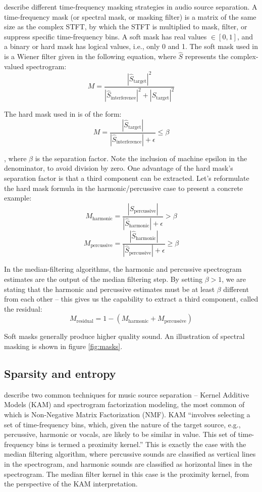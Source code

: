 \documentclass[letter,12pt]{article}
\begin{document}
\citet{masking} describe different time-frequency masking strategies in audio source separation. A time-frequency mask (or spectral mask, or masking filter) is a matrix of the same size as the complex STFT, by which the STFT is multiplied to mask, filter, or suppress specific time-frequency bins. A soft mask has real values $\in [0, 1]$, and a binary or hard mask has logical values, i.e., only 0 and 1. The soft mask used in \cite{fitzgerald1, fitzgerald2} is a Wiener filter given in the following equation, where $\hat{S}$ represents the complex-valued spectrogram:
\[ M = \frac{|\hat{S}_{\text{target}}|^{2}}{|\hat{S}_{\text{interference}}|^{2} + |\hat{S}_{\text{target}}|^{2}} \]

The hard mask used in \cite{driedger} is of the form:
\[ M = \frac{|\hat{S}_{\text{target}}|}{|\hat{S}_{\text{interference}}| + \epsilon} \le \beta \]

, where $\beta$ is the separation factor. Note the inclusion of machine epsilon in the denominator, to avoid division by zero. One advantage of the hard mask's separation factor is that a third component can be extracted. Let's reformulate the hard mask formula in the harmonic/percussive case to present a concrete example:
\[ M_{\text{harmonic}} = \frac{|\hat{S}_{\text{percussive}}|}{|\hat{S}_{\text{harmonic}}| + \epsilon} > \beta \]
\[ M_{\text{percussive}} = \frac{|\hat{S}_{\text{harmonic}}|}{|\hat{S}_{\text{percussive}}| + \epsilon} \ge \beta \]

In the median-filtering algorithms, the harmonic and percussive spectrogram estimates are the output of the median filtering step. By setting $\beta > 1$, we are stating that the harmonic and percussive estimates must be at least $\beta$ different from each other -- this gives us the capability to extract a third component, called the residual:
\[ M_{\text{residual}} = 1 - (M_{\text{harmonic}} + M_{\text{percussive}}) \]

Soft masks generally produce higher quality sound. An illustration of spectral masking is shown in figure \ref{fig:masks}.

\subsection{Sparsity and entropy}
\label{sec:theorysparsity}

\citet{musicsepgood} describe two common techniques for music source separation -- Kernel Additive Models (KAM) and spectrogram factorization modeling, the most common of which is Non-Negative Matrix Factorization (NMF). KAM ``involves selecting a set of time-frequency bins, which, given the nature of the target source, e.g., percussive, harmonic or vocals, are likely to be similar in value. This set of time-frequency bins is termed a proximity kernel.'' This is exactly the case with the median filtering algorithm, where percussive sounds are classified as vertical lines in the spectrogram, and harmonic sounds are classified as horizontal lines in the spectrogram. The median filter kernel in this case is the proximity kernel, from the perspective of the KAM interpretation.
\end{document}
